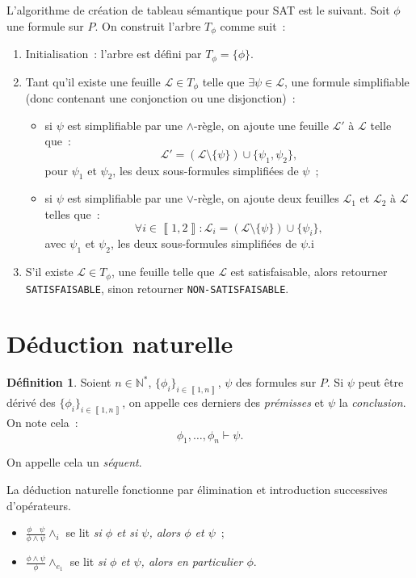 \documentclass{article}
\theoremstyle{definition}
\newtheorem{déf}[thm]{Définition}
\theoremstyle{remark}
\newcommand{\intint}[2]{\left\llbracket#1, #2\right\rrbracket}
\newcommand{\N}{\mathbb N}
\begin{document}
	L'algorithme de création de tableau sémantique pour SAT est le suivant. Soit $\phi$ une formule sur $P$. On construit l'arbre $T_\phi$ comme suit~:
	\begin{enumerate}
		\item Initialisation~: l'arbre est défini par $T_\phi = \{\phi\}$.
		\item Tant qu'il existe une feuille $\mathcal L \in T_\phi$ telle que $\exists \psi \in \mathcal L$, une formule simplifiable (donc contenant une
		conjonction ou une disjonction)~:
		\begin{itemize}
			\item si $\psi$ est simplifiable par une $\land$-règle, on ajoute une feuille $\mathcal L'$ à $\mathcal L$ telle que~:
			\[\mathcal L' = \left(\mathcal L \setminus \{\psi\}\right) \cup \{\psi_1, \psi_2\},\]
			pour $\psi_1$ et $\psi_2$, les deux sous-formules simplifiées de $\psi$~;
			\item si $\psi$ est simplifiable par une $\lor$-règle, on ajoute deux feuilles $\mathcal L_1$ et $\mathcal L_2$ à $\mathcal L$
			telles que~:
			\[\forall i \in \intint 12 : \mathcal L_i = \left(\mathcal L \setminus \{\psi\}\right) \cup \{\psi_i\},\]
			avec $\psi_1$ et $\psi_2$, les deux sous-formules simplifiées de $\psi$.i
		\end{itemize}
		\item S'il existe $\mathcal L \in T_\phi$, une feuille telle que $\mathcal L$ est satisfaisable, alors retourner \texttt{SATISFAISABLE}, sinon retourner
		\texttt{NON-SATISFAISABLE}.
	\end{enumerate}

\section{Déduction naturelle}
	\begin{déf} Soient $n \in \N^*$, $\{\phi_i\}_{i \in \intint 1n}$, $\psi$ des formules sur $P$. Si $\psi$ peut être dérivé des $\{\phi_i\}_{i \in \intint 1n}$,
	on appelle ces derniers des \textit{prémisses} et $\psi$ la \textit{conclusion}. On note cela~:
	\[\phi_1, \ldots, \phi_n \vdash \psi.\]

	On appelle cela un \textit{séquent}.
	\end{déf}

	La déduction naturelle fonctionne par élimination et introduction successives d'opérateurs.

	\begin{itemize}
		\item $\frac {\phi \quad \psi}{\phi \land \psi}\land_i$ se lit \textit{si $\phi$ et si $\psi$, alors $\phi$ et $\psi$}~;
		\item $\frac {\phi \land \psi}{\phi}\land_{e_1}$ se lit \textit{si $\phi$ et $\psi$, alors en particulier $\phi$}.
	\end{itemize}
\end{document}
